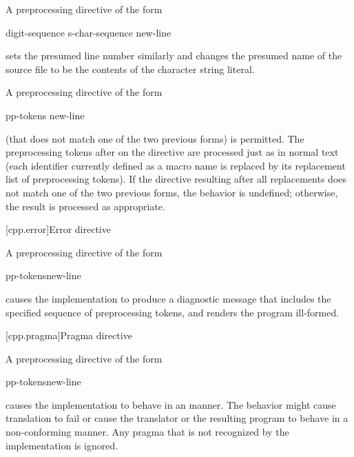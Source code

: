 \pnum
A preprocessing directive of the form

\begin{ncsimplebnf}
 digit-sequence  s-char-sequence\opt{}  new-line
\end{ncsimplebnf}

sets the presumed line number similarly and changes the
presumed name of the source file to be the contents
of the character string literal.

\pnum
A preprocessing directive of the form

\begin{ncsimplebnf}
 pp-tokens new-line
\end{ncsimplebnf}

(that does not match one of the two previous forms)
is permitted.
The preprocessing tokens after
on the directive are processed just as in normal text
(each identifier currently defined as a macro name is replaced by its
replacement list of preprocessing tokens).
If the directive resulting after all replacements does not match
one of the two previous forms, the behavior is undefined;
otherwise, the result is processed as appropriate.

[cpp.error]{Error directive}%
%

\pnum
A preprocessing directive of the form

\begin{ncsimplebnf}
 pp-tokens\opt new-line
\end{ncsimplebnf}

causes the implementation to produce
a diagnostic message that includes the specified sequence of preprocessing tokens,
and renders the program ill-formed.

[cpp.pragma]{Pragma directive}%
%

\pnum
A preprocessing directive of the form

\begin{ncsimplebnf}
 pp-tokens\opt new-line
\end{ncsimplebnf}

causes the implementation to behave
in an  manner.
The behavior might cause translation to fail or cause the translator or
the resulting program to behave in a non-conforming manner.
Any pragma that is not recognized by the implementation is ignored.

